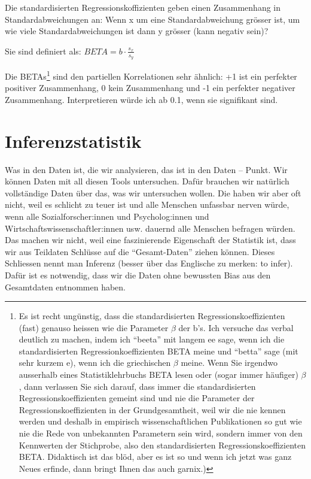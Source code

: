 \documentclass[
  10pt,
  letterpaper,
  a4paper, twoside]{scrreprt}
\begin{document}
Die standardisierten Regressionskoffizienten geben einen Zusammenhang in
Standardabweichungen an: Wenn x um eine Standardabweichung grösser ist,
um wie viele Standardabweichungen ist dann y grösser (kann negativ
sein)?

Sie sind definiert als: \(BETA = b\cdot\frac{s_x}{s_y}\)

Die BETAs\footnote{Es ist recht ungünstig, dass die standardisierten
  Regressionskoeffizienten (fast) genauso heissen wie die Parameter
  \(\beta\) der b's. Ich versuche das verbal deutlich zu machen, indem
  ich \enquote{beeta} mit langem ee sage, wenn ich die standardisierten
  Regressionkoeffizienten BETA meine und \enquote{betta} sage (mit sehr
  kurzem e), wenn ich die griechischen \(\beta\) meine. Wenn Sie
  irgendwo ausserhalb eines Statistiklehrbuchs BETA lesen oder (sogar
  immer häufiger) \(\beta\), dann verlassen Sie sich darauf, dass immer
  die standardisierten Regressionskoeffizienten gemeint sind und nie die
  Parameter der Regressionskoeffizienten in der Grundgesamtheit, weil
  wir die nie kennen werden und deshalb in empirisch wissenschaftlichen
  Publikationen so gut wie nie die Rede von unbekannten Parametern sein
  wird, sondern immer von den Kennwerten der Stichprobe, also den
  standardisierten Regressionskoeffizienten BETA. Didaktisch ist das
  blöd, aber es ist so und wenn ich jetzt was ganz Neues erfinde, dann
  bringt Ihnen das auch garnix.)} sind den partiellen Korrelationen sehr
ähnlich: +1 ist ein perfekter positiver Zusammenhang, 0 kein
Zusammenhang und -1 ein perfekter negativer Zusammenhang. Interpretieren
würde ich ab 0.1, wenn sie signifikant sind.

\section{Inferenzstatistik}\label{inferenzstatistik}

Was in den Daten ist, die wir analysieren, das ist in den Daten --
Punkt. Wir können Daten mit all diesen Tools untersuchen. Dafür brauchen
wir natürlich vollständige Daten über das, was wir untersuchen wollen.
Die haben wir aber oft nicht, weil es schlicht zu teuer ist und alle
Menschen unfassbar nerven würde, wenn alle Sozialforscher:innen und
Psycholog:innen und Wirtschaftswissenschaftler:innen usw. dauernd alle
Menschen befragen würden. Das machen wir nicht, weil eine faszinierende
Eigenschaft der Statistik ist, dass wir aus Teildaten Schlüsse auf die
\enquote{Gesamt-Daten} ziehen können. Dieses Schliessen nennt man
Inferenz (besser über das Englische zu merken: to infer). Dafür ist es
notwendig, dass wir die Daten ohne bewussten Bias aus den Gesamtdaten
entnommen haben.
\end{document}
